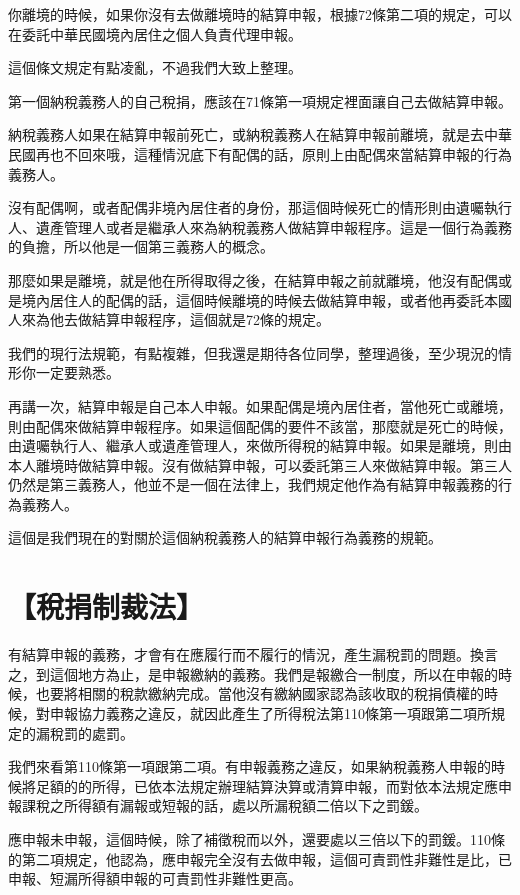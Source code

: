 \documentclass[oneside,sub3section]{ctexbook}
\begin{document}
你離境的時候，如果你沒有去做離境時的結算申報，根據72條第二項的規定，可以在委託中華民國境內居住之個人負責代理申報。

這個條文規定有點凌亂，不過我們大致上整理。

第一個納稅義務人的自己稅捐，應該在71條第一項規定裡面讓自己去做結算申報。

納稅義務人如果在結算申報前死亡，或納稅義務人在結算申報前離境，就是去中華民國再也不回來哦，這種情況底下有配偶的話，原則上由配偶來當結算申報的行為義務人。

沒有配偶啊，或者配偶非境內居住者的身份，那這個時候死亡的情形則由遺囑執行人、遺產管理人或者是繼承人來為納稅義務人做結算申報程序。這是一個行為義務的負擔，所以他是一個第三義務人的概念。

那麼如果是離境，就是他在所得取得之後，在結算申報之前就離境，他沒有配偶或是境內居住人的配偶的話，這個時候離境的時候去做結算申報，或者他再委託本國人來為他去做結算申報程序，這個就是72條的規定。

我們的現行法規範，有點複雜，但我還是期待各位同學，整理過後，至少現況的情形你一定要熟悉。

再講一次，結算申報是自己本人申報。如果配偶是境內居住者，當他死亡或離境，則由配偶來做結算申報程序。如果這個配偶的要件不該當，那麼就是死亡的時候，由遺囑執行人、繼承人或遺產管理人，來做所得稅的結算申報。如果是離境，則由本人離境時做結算申報。沒有做結算申報，可以委託第三人來做結算申報。第三人仍然是第三義務人，他並不是一個在法律上，我們規定他作為有結算申報義務的行為義務人。

這個是我們現在的對關於這個納稅義務人的結算申報行為義務的規範。

\hypertarget{ux7a05ux6350ux5236ux88c1ux6cd5}{%
\chapter{【稅捐制裁法】}\label{ux7a05ux6350ux5236ux88c1ux6cd5}}

有結算申報的義務，才會有在應履行而不履行的情況，產生漏稅罰的問題。換言之，到這個地方為止，是申報繳納的義務。我們是報繳合一制度，所以在申報的時候，也要將相關的稅款繳納完成。當他沒有繳納國家認為該收取的稅捐債權的時候，對申報協力義務之違反，就因此產生了所得稅法第110條第一項跟第二項所規定的漏稅罰的處罰。

我們來看第110條第一項跟第二項。有申報義務之違反，如果納稅義務人申報的時候將足額的的所得，已依本法規定辦理結算決算或清算申報，而對依本法規定應申報課稅之所得額有漏報或短報的話，處以所漏稅額二倍以下之罰鍰。

應申報未申報，這個時候，除了補徵稅而以外，還要處以三倍以下的罰鍰。110條的第二項規定，他認為，應申報完全沒有去做申報，這個可責罰性非難性是比，已申報、短漏所得額申報的可責罰性非難性更高。
\end{document}

